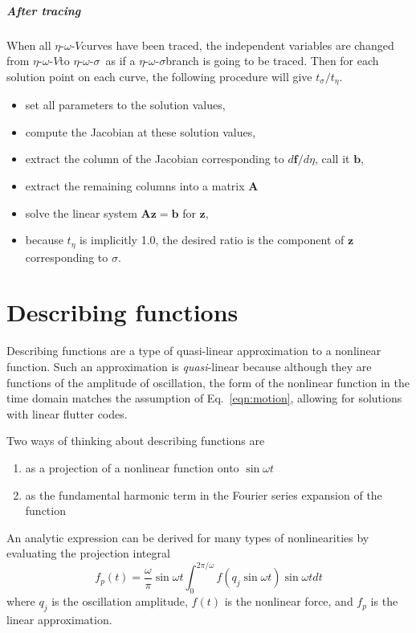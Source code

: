 \documentclass[10pt,openany,twoside]{book}
\numberwithin{equation}{section}   %
\newcommand{\Matrix}[1]{\boldsymbol{#1}}
\newcommand{\Vector}[1]{\boldsymbol{#1}}
\newcommand{\Eqn}[1]{Eq.\ \ref{#1}}
\newcommand{\EOV}{$\eta$-$\omega$-$V$\:}                 %
\newcommand{\EOS}{$\eta$-$\omega$-$\sigma$\:}            %
\begin{document}
\subparagraph{After tracing}
When all \EOV curves have been traced, the independent variables are
changed from \EOV to \EOS\ as if a \EOS branch is going to be traced.
Then for each solution point on each curve, the following procedure will
give $t_{\sigma}/t_{\eta}$.
\begin{itemize}
	\item set all parameters to the solution values,
	\item compute the Jacobian at these solution values,
	\item extract the column of the Jacobian corresponding to
		$d\Vector{f}/d\eta$, call it $\Vector{b}$,
	\item extract the remaining columns into a matrix $\Matrix{A}$
	\item solve the linear system $\Matrix{A}\Vector{z} = \Vector{b}$ for
		$\Vector{z}$,
	\item because $t_\eta$ is implicitly 1.0, the desired ratio is
		the component of $\Vector{z}$ corresponding to $\sigma$.
\end{itemize}

\section{Describing functions}\label{sect:desc-fun}
Describing functions are a type of quasi-linear approximation to a
nonlinear function. Such an approximation is {\em quasi}-linear because
although they are functions of the amplitude of oscillation, the 
form of the nonlinear function in the time domain matches the
assumption of \Eqn{eqn:motion}, allowing for solutions with linear
flutter codes.

Two ways of thinking about describing functions are
\begin{enumerate}
	\item as a projection of a nonlinear function onto $\sin \omega t$
	\item as the fundamental harmonic term in the Fourier series
			expansion of the function
\end{enumerate}

An analytic expression can be derived for
many types of nonlinearities by evaluating the projection integral
\begin{equation}\label{eqn:df-defn}
f_{p} (t) = \frac{\omega}{\pi} \sin \omega t
	\int_{0}^{2\pi/\omega} f(q_j \sin \omega t) \sin \omega t dt
\end{equation}
where $q_j$ is the oscillation amplitude, $f(t)$ is the nonlinear force,
and $f_p$ is the linear approximation.
\end{document}
